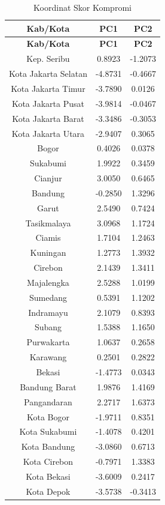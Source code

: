 \begin{longtable}{|c|c|c|}
\caption{Koordinat Skor Kompromi} \label{tab:scores} \\
\hline
\textbf{Kab/Kota} & \textbf{PC1} & \textbf{PC2} \\
\hline
\endfirsthead
\hline
\textbf{Kab/Kota} & \textbf{PC1} & \textbf{PC2} \\
\hline
\endhead
\hline
\endfoot
Kep. Seribu & 0.8923 & -1.2073 \\
Kota Jakarta Selatan & -4.8731 & -0.4667 \\
Kota Jakarta Timur & -3.7890 & 0.0126 \\
Kota Jakarta Pusat & -3.9814 & -0.0467 \\
Kota Jakarta Barat & -3.3486 & -0.3053 \\
Kota Jakarta Utara & -2.9407 & 0.3065 \\
Bogor & 0.4026 & 0.0378 \\
Sukabumi & 1.9922 & 0.3459 \\
Cianjur & 3.0050 & 0.6465 \\
Bandung & -0.2850 & 1.3296 \\
Garut & 2.5490 & 0.7424 \\
Tasikmalaya & 3.0968 & 1.1724 \\
Ciamis & 1.7104 & 1.2463 \\
Kuningan & 1.2773 & 1.3932 \\
Cirebon & 2.1439 & 1.3411 \\
Majalengka & 2.5288 & 1.0199 \\
Sumedang & 0.5391 & 1.1202 \\
Indramayu & 2.1079 & 0.8393 \\
Subang & 1.5388 & 1.1650 \\
Purwakarta & 1.0637 & 0.2658 \\
Karawang & 0.2501 & 0.2822 \\
Bekasi & -1.4773 & 0.0343 \\
Bandung Barat & 1.9876 & 1.4169 \\
Pangandaran & 2.2717 & 1.6373 \\
Kota Bogor & -1.9711 & 0.8351 \\
Kota Sukabumi & -1.4078 & 0.4201 \\
Kota Bandung & -3.0860 & 0.6713 \\
Kota Cirebon & -0.7971 & 1.3383 \\
Kota Bekasi & -3.6009 & 0.2417 \\
Kota Depok & -3.5738 & -0.3413 \\

\end{longtable}
